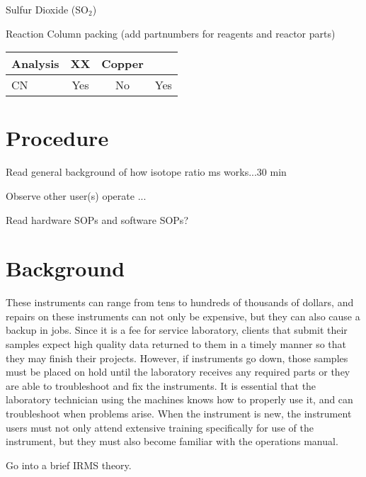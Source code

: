 \documentclass[12pt]{../SOP3_beta}\usepackage[]{graphicx}\usepackage[]{color}
\begin{document}
\NP Sulfur Dioxide (SO$_2$)

\NP Reaction Column packing (add partnumbers for reagents and reactor parts)

\begin{table}[h]
\begin{tabular}{lccc} \hline
Analysis      & XX    & Copper  & \\ \hline\hline
CN            & Yes   & No      & Yes \\ \hline


\end{tabular}
\end{table}




\section{Procedure}

\NP Read general background of how isotope ratio ms works...30 min

\NP Observe other user(s) operate ...

\NP Read hardware SOPs and software SOPs?

\section{Background}

These instruments can range from tens to hundreds of thousands of dollars, and repairs on these instruments can not only be expensive, but they can also cause a backup in jobs. Since it is a fee for service laboratory, clients that submit their samples expect high quality data returned to them in a timely manner so that they may finish their projects. However, if instruments go down, those samples must be placed on hold until the laboratory receives any required parts or they are able to troubleshoot and fix the instruments. It is essential that the laboratory technician using the machines knows how to properly use it, and can troubleshoot when problems arise. When the instrument is new, the instrument users must not only attend extensive training specifically for use of the instrument, but they must also become familiar with the operations manual.

Go into a brief IRMS theory.
\end{document}
